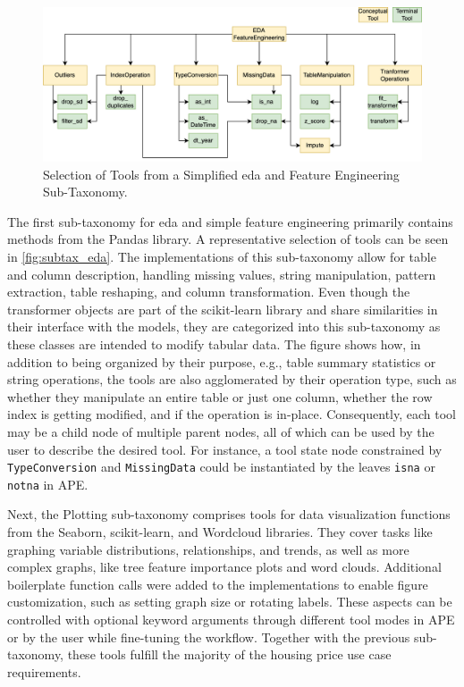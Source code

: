 \begin{figure}
    \centering
    \includegraphics[width=\linewidth]{Tex/images/ToolsSimple.png}
    \caption{Selection of Tools from a Simplified \ac{eda} and Feature Engineering Sub-Taxonomy.}
    \label{fig:subtax_eda}
\end{figure}

The first sub-taxonomy for \ac{eda} and simple feature engineering primarily contains methods from the Pandas library. A representative selection of tools can be seen in \autoref{fig:subtax_eda}. The implementations of this sub-taxonomy allow for table and column description, handling missing values, string manipulation, pattern extraction, table reshaping, and column transformation. Even though the transformer objects are part of the scikit-learn library and share similarities in their interface with the models, they are categorized into this sub-taxonomy as these classes are intended to modify tabular data. The figure shows how, in addition to being organized by their purpose, e.g., table summary statistics or string operations, the tools are also agglomerated by their operation type, such as whether they manipulate an entire table or just one column, whether the row index is getting modified, and if the operation is in-place. Consequently, each tool may be a child node of multiple parent nodes, all of which can be used by the user to describe the desired tool. For instance, a tool state node constrained by \verb|TypeConversion| and \verb|MissingData| could be instantiated by the leaves \verb|isna| or \verb|notna| in APE.

Next, the Plotting sub-taxonomy comprises tools for data visualization functions from the Seaborn, scikit-learn, and Wordcloud libraries. They cover tasks like graphing variable distributions, relationships, and trends, as well as more complex graphs, like tree feature importance plots and word clouds. Additional boilerplate function calls were added to the implementations to enable figure customization, such as setting graph size or rotating labels. These aspects can be controlled with optional keyword arguments through different tool modes in APE or by the user while fine-tuning the workflow. Together with the previous sub-taxonomy, these tools fulfill the majority of the housing price use case requirements.

